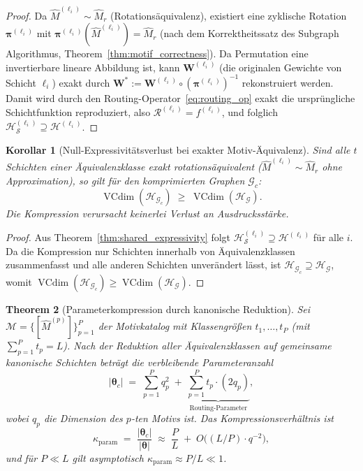 ﻿\documentclass[12pt, a4paper, openany]{report}
\newtheorem{theorem}{Theorem}[chapter]
\newtheorem{corollary}[theorem]{Korollar}
\newcommand{\calG}{\mathcal{G}}
\newcommand{\calH}{\mathcal{H}}
\newcommand{\calR}{\mathcal{R}}
\newcommand{\calM}{\mathcal{M}}
\newcommand{\calS}{\mathcal{S}}
\DeclareMathOperator{\VC}{VCdim}
\begin{document}
\begin{proof}
Da $\hat{M}^{(\ell_i)} \sim \hat{M}_r$ (Rotationsäquivalenz), existiert eine
zyklische Rotation $\bm{\pi}^{(\ell_i)}$ mit
$\bm{\pi}^{(\ell_i)}(\hat{M}^{(\ell_i)}) = \hat{M}_r$ (nach dem
Korrektheitssatz des Subgraph Algorithmus, Theorem~\ref{thm:motif_correctness}).
Da Permutation eine invertierbare lineare Abbildung ist, kann
$\bm{W}^{(\ell_i)}$ (die originalen Gewichte von Schicht $\ell_i$) exakt durch
$\bm{W}^* := \bm{W}^{(\ell_i)} \circ (\bm{\pi}^{(\ell_i)})^{-1}$ rekonstruiert
werden.  Damit wird durch den Routing-Operator~\eqref{eq:routing_op} exakt
die ursprüngliche Schichtfunktion reproduziert, also
$\calR^{(\ell_i)} = f^{(\ell_i)}$, und folglich
$\calH_{\calS}^{(\ell_i)} \supseteq \calH^{(\ell_i)}$.
\end{proof}

\begin{corollary}[Null-Expressivitätsverlust bei exakter Motiv-Äquivalenz]
\label{cor:no_loss}
Sind alle $t$ Schichten einer Äquivalenzklasse exakt rotationsäquivalent
($\hat{M}^{(\ell_i)} \sim \hat{M}_r$ ohne Approximation), so gilt für den
komprimierten Graphen $\calG_c$:
\[
  \VC(\calH_{\calG_c}) \;\geq\; \VC(\calH_{\calG}).
\]
Die Kompression verursacht keinerlei Verlust an Ausdrucksstärke.
\end{corollary}

\begin{proof}
Aus Theorem~\ref{thm:shared_expressivity} folgt
$\calH_{\calS}^{(\ell_i)} \supseteq \calH^{(\ell_i)}$ für alle $i$.
Da die Kompression nur Schichten innerhalb von Äquivalenzklassen
zusammenfasst und alle anderen Schichten unverändert lässt, ist
$\calH_{\calG_c} \supseteq \calH_{\calG}$, womit
$\VC(\calH_{\calG_c}) \geq \VC(\calH_{\calG})$.
\end{proof}

\begin{theorem}[Parameterkompression durch kanonische Reduktion]
\label{thm:param_compression}
Sei $\calM = \{[\hat{M}^{(p)}]\}_{p=1}^P$ der Motivkatalog mit
Klassengrößen $t_1, \ldots, t_P$ (mit $\sum_{p=1}^P t_p = L$).
Nach der Reduktion aller Äquivalenzklassen auf gemeinsame kanonische
Schichten beträgt die verbleibende Parameteranzahl
\begin{equation}
  \label{eq:param_count}
  |\bm{\theta}_c|
  \;=\;
  \sum_{p=1}^{P} q_p^2
  \;+\;
  \underbrace{\sum_{p=1}^{P} t_p \cdot (2q_p)}_{\text{Routing-Parameter}},
\end{equation}
wobei $q_p$ die Dimension des $p$-ten Motivs ist.  Das
\emph{Kompressionsver\-hältnis} ist
\begin{equation}
  \label{eq:compression_ratio}
  \kappa_{\mathrm{param}}
  \;=\;
  \frac{|\bm{\theta}_c|}{|\bm{\theta}|}
  \;\approx\;
  \frac{P}{L} \;+\; O\!\bigl((L/P) \cdot q^{-2}\bigr),
\end{equation}
und für $P \ll L$ gilt asymptotisch $\kappa_{\mathrm{param}} \approx P/L \ll 1$.
\end{theorem}
\end{document}
